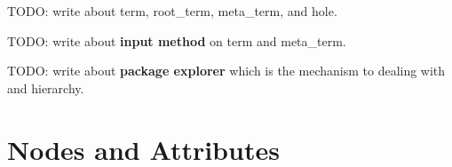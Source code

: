 \documentclass[11pt, a4paper]{article}
\begin{document}
TODO: write about term, root\_term, meta\_term, and hole.

TODO: write about \textbf{input method} on term and meta\_term.

TODO: write about \textbf{package explorer} which is the mechanism to dealing with  and  hierarchy.

\def\arraystretch{1.5}%



\newcommand{\node}[2]{
    \vspace{0.2cm}
    \begin{metablock}[frametitle={#1}]
        \begin{tabular}{l l}
            #2
        \end{tabular}
    \end{metablock}
    \vspace{0.3cm}
}

\newcommand{\ban}[1]{
    \multicolumn{1}{l}{
        \begin{tcolorbox} [
             skin=enhancedmiddle jigsaw,
             colback = blockBackColor,
             colframe = defaultFrameColor,
             left=0mm,
             top=0mm,
             bottom=0mm,
             boxrule=0mm,
             leftrule=1mm,
             rightrule=-1mm
        ]
        \begin{tabular}{l}
            #1
        \end{tabular}
        \end{tcolorbox}
    } \\
}

\newcommand{\bas}[1]{
    \nunderline{#1}{defaultFrameColor}
}

\newpage

\section{Nodes and Attributes}
\end{document}
